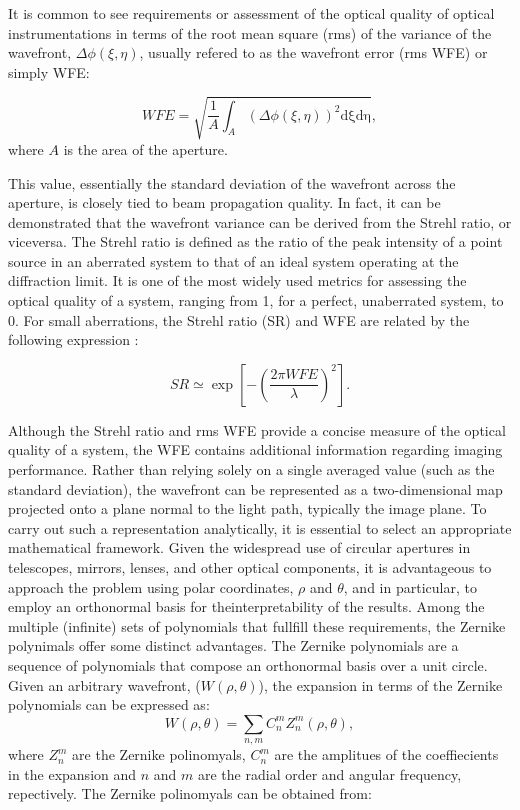 It is common to see requirements or assessment of the optical quality of optical instrumentations in terms of the root mean square (rms) of the variance of the wavefront, $\Delta \phi (\xi, \eta)$, usually refered to as the wavefront error (rms WFE) or simply WFE:

\begin{equation}
  WFE = \sqrt{\frac{1}{A}\int _ {A} \left( \Delta \phi (\xi, \eta) \right) ^2 \mathrm{d \xi}\mathrm{d \eta}},
\end{equation}
where $A$ is the area of the aperture. 

This value, essentially the standard deviation of the wavefront across the aperture, is closely tied to beam propagation quality. In fact, it can be demonstrated that the wavefront variance can be derived from the Strehl ratio, or viceversa. The Strehl ratio is defined as the ratio of the peak intensity of a point source in an aberrated system to that of an ideal system operating at the diffraction limit. It is one of the most widely used metrics for assessing the optical quality of a system, ranging from 1, for a perfect, unaberrated system, to 0. For small aberrations, the Strehl ratio (SR) and WFE are related by the following expression \citep{WFE_def}: 

\begin{equation}
  SR \simeq \exp \left[ - \left(\frac{2\pi WFE}{\lambda}\right) ^2 \right].
\end{equation}

Although the Strehl ratio and rms WFE provide a concise measure of the optical quality of a system, the WFE contains additional information regarding imaging performance. Rather than relying solely on a single averaged value (such as the standard deviation), the wavefront can be represented as a two-dimensional map projected onto a plane normal to the light path, typically the image plane. To carry out such a representation analytically, it is essential to select an appropriate mathematical framework. Given the widespread use of circular apertures in telescopes, mirrors, lenses, and other optical components, it is advantageous to approach the problem using polar coordinates, $\rho$ and $\theta$, and in particular, to employ an orthonormal basis for theinterpretability of the results. Among the multiple (infinite) sets of polynomials that fullfill these requirements, the Zernike polynimals \citep{Zernike} offer some distinct advantages. The Zernike polynomials are a sequence of polynomials that compose an orthonormal basis over a unit circle. Given an arbitrary wavefront, ($W(\rho, \theta)$), the expansion in terms of the Zernike polynomials can be expressed as:
\begin{equation}
  W(\rho, \theta) = \sum_{n, m} C _n ^m Z _ n ^m(\rho, \theta),
\end{equation}
where $Z _n ^m$ are the Zernike polinomyals, $C_n ^m$ are the amplitues of the coeffiecients in the expansion and $n$ and $m$ are the radial order and angular frequency, repectively. The Zernike polinomyals can be obtained from:

